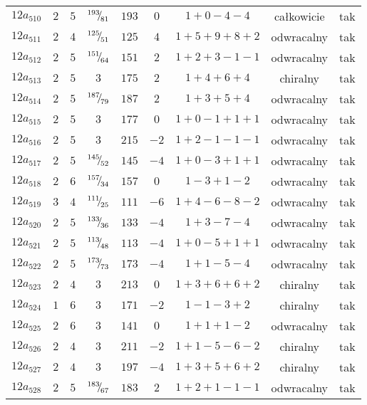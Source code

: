\begin{longtable}{ccccccccc}
$12a_{510}$ & $2$ & $5$ & ${}^{193}{\mskip -5mu/\mskip -3mu}_{81}$ & $193$ & $0$ & $1+0-4-4$ & całkowicie & tak \\
$12a_{511}$ & $2$ & $4$ & ${}^{125}{\mskip -5mu/\mskip -3mu}_{51}$ & $125$ & $4$ & $1+5+9+8+2$ & odwracalny & tak \\
$12a_{512}$ & $2$ & $5$ & ${}^{151}{\mskip -5mu/\mskip -3mu}_{64}$ & $151$ & $2$ & $1+2+3-1-1$ & odwracalny & tak \\
$12a_{513}$ & $2$ & $5$ & $3$ & $175$ & $2$ & $1+4+6+4$ & chiralny & tak \\
$12a_{514}$ & $2$ & $5$ & ${}^{187}{\mskip -5mu/\mskip -3mu}_{79}$ & $187$ & $2$ & $1+3+5+4$ & odwracalny & tak \\
$12a_{515}$ & $2$ & $5$ & $3$ & $177$ & $0$ & $1+0-1+1+1$ & odwracalny & tak \\
$12a_{516}$ & $2$ & $5$ & $3$ & $215$ & $-2$ & $1+2-1-1-1$ & odwracalny & tak \\
$12a_{517}$ & $2$ & $5$ & ${}^{145}{\mskip -5mu/\mskip -3mu}_{52}$ & $145$ & $-4$ & $1+0-3+1+1$ & odwracalny & tak \\
$12a_{518}$ & $2$ & $6$ & ${}^{157}{\mskip -5mu/\mskip -3mu}_{34}$ & $157$ & $0$ & $1-3+1-2$ & odwracalny & tak \\
$12a_{519}$ & $3$ & $4$ & ${}^{111}{\mskip -5mu/\mskip -3mu}_{25}$ & $111$ & $-6$ & $1+4-6-8-2$ & odwracalny & tak \\
$12a_{520}$ & $2$ & $5$ & ${}^{133}{\mskip -5mu/\mskip -3mu}_{36}$ & $133$ & $-4$ & $1+3-7-4$ & odwracalny & tak \\
$12a_{521}$ & $2$ & $5$ & ${}^{113}{\mskip -5mu/\mskip -3mu}_{48}$ & $113$ & $-4$ & $1+0-5+1+1$ & odwracalny & tak \\
$12a_{522}$ & $2$ & $5$ & ${}^{173}{\mskip -5mu/\mskip -3mu}_{73}$ & $173$ & $-4$ & $1+1-5-4$ & odwracalny & tak \\
$12a_{523}$ & $2$ & $4$ & $3$ & $213$ & $0$ & $1+3+6+6+2$ & chiralny & tak \\
$12a_{524}$ & $1$ & $6$ & $3$ & $171$ & $-2$ & $1-1-3+2$ & chiralny & tak \\
$12a_{525}$ & $2$ & $6$ & $3$ & $141$ & $0$ & $1+1+1-2$ & odwracalny & tak \\
$12a_{526}$ & $2$ & $4$ & $3$ & $211$ & $-2$ & $1+1-5-6-2$ & chiralny & tak \\
$12a_{527}$ & $2$ & $4$ & $3$ & $197$ & $-4$ & $1+3+5+6+2$ & chiralny & tak \\
$12a_{528}$ & $2$ & $5$ & ${}^{183}{\mskip -5mu/\mskip -3mu}_{67}$ & $183$ & $2$ & $1+2+1-1-1$ & odwracalny & tak \\

\end{longtable}
